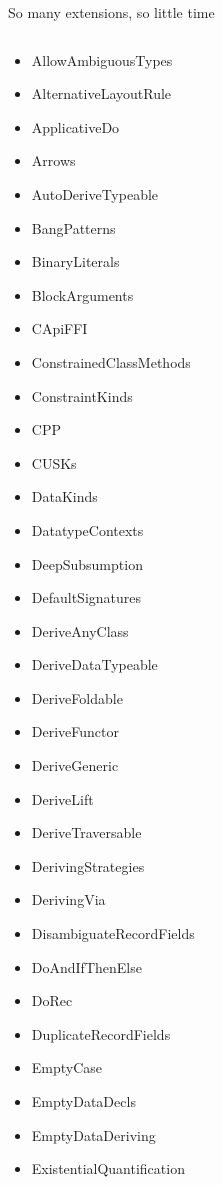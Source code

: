 \documentclass[handout]{beamer}
\begin{document}
\begin{frame}{So many extensions, so little time}

\tiny

\vspace{-2ex}

\begin{columns}[T]
  \begin{column}{.33\textwidth}
    \begin{itemize}\itemsep0em \itemindent-1.5em
      \item AllowAmbiguousTypes \item AlternativeLayoutRule \item ApplicativeDo \item Arrows \item AutoDeriveTypeable \item BangPatterns \item BinaryLiterals \item BlockArguments \item CApiFFI \item ConstrainedClassMethods \item ConstraintKinds \item CPP \item CUSKs \item DataKinds \item DatatypeContexts \item DeepSubsumption \item DefaultSignatures \item DeriveAnyClass \item DeriveDataTypeable \item DeriveFoldable \item DeriveFunctor \item DeriveGeneric \item DeriveLift \item DeriveTraversable \item DerivingStrategies \item DerivingVia \item DisambiguateRecordFields \item DoAndIfThenElse \item DoRec \item DuplicateRecordFields \item EmptyCase \item EmptyDataDecls \item EmptyDataDeriving \item ExistentialQuantification
    \end{itemize}

\end{column}
\end{columns}
\end{frame}
\end{document}
